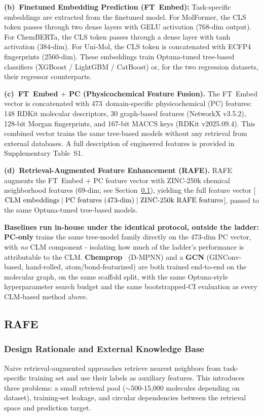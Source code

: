 \documentclass[final,1p,times]{elsarticle}
\begin{document}
\textbf{(b)~Finetuned Embedding Prediction (FT~Embed):}
Task-specific embeddings are extracted from the finetuned model. For MolFormer, the CLS token passes through two dense layers with GELU activation (768-dim output). For ChemBERTa, the CLS token passes through a dense layer with tanh activation (384-dim). For Uni-Mol, the CLS token is concatenated with ECFP4 fingerprints (2560-dim). These embeddings train Optuna-tuned \cite{akiba2019optuna} tree-based classifiers (XGBoost / LightGBM / CatBoost) or, for the two regression datasets, their regressor counterparts.

\textbf{(c)~FT~Embed $+$ PC (Physicochemical Feature Fusion).}
The FT~Embed vector is concatenated with 473~domain-specific physicochemical (PC) features: 148 RDKit molecular descriptors, 30 graph-based features (NetworkX v3.5.2), 128-bit Morgan fingerprints, and 167-bit MACCS keys (RDKit v2025.09.4). This combined vector trains the same tree-based models without any retrieval from external databases. A full description of engineered features is provided in Supplementary Table~S1.

\textbf{(d)~Retrieval-Augmented Feature Enhancement (RAFE).}
RAFE augments the FT~Embed $+$ PC feature vector with ZINC-250k chemical neighborhood features (69-dim; see Section~\ref{sec:rafe}), yielding the full feature vector [$\text{CLM embeddings} \mid \text{PC features (473-dim)} \mid \text{ZINC-250k RAFE\- features}$], passed to the same Optuna-tuned tree-based models.

\textbf{Baselines run in-house under the identical protocol, outside the ladder:} \textbf{PC-only} trains the same tree-model family directly on the 473-dim PC vector, with \emph{no} CLM component - isolating how much of the ladder's performance is attributable to the CLM. \textbf{Chemprop}~\cite{yang2019chemprop} (D-MPNN) and a \textbf{GCN} (GINConv-based, hand-rolled, atom/bond-featurized) are both trained end-to-end on the molecular graph, on the same scaffold split, with the same Optuna-style hyperparameter search budget and the same bootstrapped-CI evaluation as every CLM-based method above.

\subsection{RAFE} \label{sec:rafe}
\subsubsection{Design Rationale and External Knowledge Base} \label{sec:zinc_rationale}
Naive retrieval-augmented approaches retrieve nearest neighbors from task-specific training set and use their labels as auxiliary features. This introduces three problems: a small retrieval pool ($\sim$500-15,000 molecules depending on dataset), training-set leakage, and circular dependencies between the retrieval space and prediction target.
\end{document}
